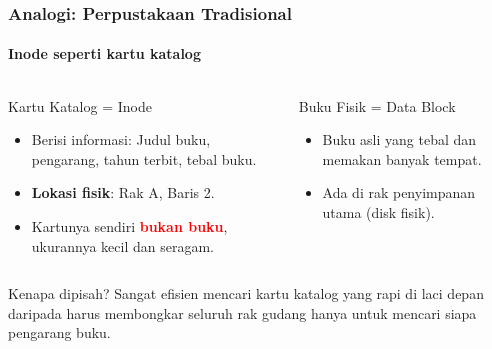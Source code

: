 \documentclass[t,aspectratio=169,xcolor=dvipsnames]{beamer}
\newcommand{\tem}[1]{\textbf{\textcolor{red}{#1}}}
\begin{document}
\begin{frame}
    \frametitle{Analogi: Perpustakaan Tradisional}
    \framesubtitle{Inode seperti kartu katalog}
    \small

    \begin{columns}[T]
        \begin{block}{Kartu Katalog = Inode}
            \begin{itemize}
                \item Berisi informasi: Judul buku, pengarang, tahun terbit, tebal buku.
                \item \textbf{Lokasi fisik}: Rak A, Baris 2.
                \item Kartunya sendiri \tem{bukan buku}, ukurannya kecil dan seragam.
            \end{itemize}
        \end{block}
        
        \begin{block}{Buku Fisik = Data Block}
            \begin{itemize}
                \item Buku asli yang tebal dan memakan banyak tempat.
                \item Ada di rak penyimpanan utama (disk fisik).
            \end{itemize}
        \end{block}
    \end{columns}

    \vspace{0.4cm}
    \begin{exampleblock}{Kenapa dipisah?}
        Sangat efisien mencari kartu katalog yang rapi di laci depan daripada harus membongkar seluruh rak gudang hanya untuk mencari siapa pengarang buku.
    \end{exampleblock}
\end{frame}
\end{document}
